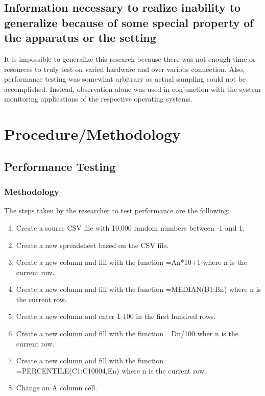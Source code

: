 \documentclass[12pt,oneside,letterpaper,titlepage]{article}
\begin{document}
\subsection{Information necessary to realize inability to generalize because of some special property of the apparatus or the setting}

It is impossible to generalize this research because there was not enough time
or resources to truly test on varied hardware and over various connection.
Also, performance testing was somewhat arbitrary as actual sampling could not be
accomplished.  Instead, observation alone was used in conjunction with the
system monitoring applications of the respective operating systems.

\section{Procedure/Methodology}

\subsection{Performance Testing}

\subsubsection{Methodology}

The steps taken by the researcher to test performance are the following:

\begin{enumerate}

\item Create a source CSV file with 10,000 random numbers between -1 and 1.

\item Create a new spreadsheet based on the CSV file.

\item Create a new column and fill with the function =An*10+1 where n is the
  current row.

\item Create a new column and fill with the function =MEDIAN(B1:Bn) where n is
  the current row.

\item Create a new column and enter 1-100 in the first hundred rows.

\item Create a new column and fill with the function =Dn/100 wher n is the
  current row.

\item Create a new column and fill with the function =PERCENTILE(C1:C10004,En)
  where n is the current row.

\item Change an A column cell.

\end{enumerate}
\end{document}
